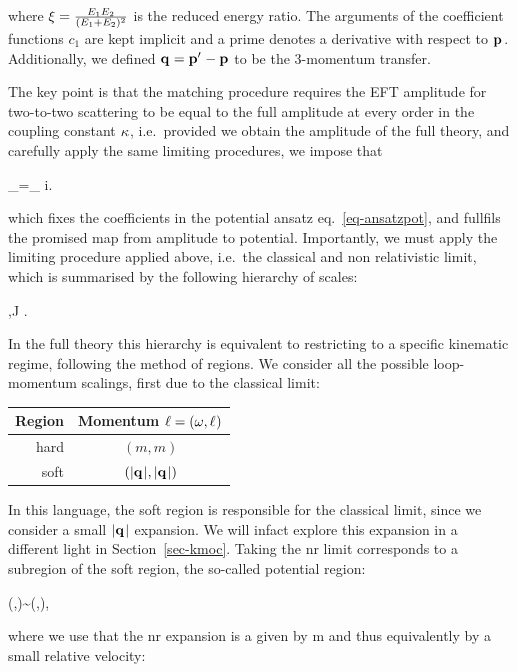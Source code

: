 \documentclass[
  11pt,
  a4paper,
  DIV=11,
  numbers=noendperiod,
  twoside]{scrreprt}
\let\[\relax \let\]\relax %
\DeclareRobustCommand{\[}{\begin{equation}}
\DeclareRobustCommand{\]}{\end{equation}}
\begin{document}
where
\(\redEratio=\frac{\energy[1]\energy[2]}{\pa{\energy[1]+\energy[2]}^2}\)
is the reduced energy ratio. The arguments of the coefficient functions
\(c_1\) are kept implicit and a prime denotes a derivative with respect
to \(\tv{\emom}\). Additionally, we defined \(\tv{q}=\tv{p'}-\tv{p}\) to
be the 3-momentum transfer.

The key point is that the matching procedure requires the EFT amplitude
for two-to-two scattering to be equal to the full amplitude at every
order in the coupling constant \(\coupling\), i.e.~provided we obtain
the amplitude of the full theory, and carefully apply the same limiting
procedures, we impose that

\[
\ampl[(i)]_=\ampl[(i)]_ \quad \forall i.
\]

which fixes the coefficients in the potential ansatz
eq.~\ref{eq-ansatzpot}, and fullfils the promised map from amplitude to
potential. Importantly, we must apply the limiting procedure applied
above, i.e.~the classical and non relativistic limit, which is
summarised by the following hierarchy of scales:

\[
\mass[1],\mass[2]\ll J  \ll {}.
\]

In the full theory this hierarchy is equivalent to restricting to a
specific kinematic regime, following the method of regions. We consider
all the possible loop-momentum scalings, first due to the classical
limit:

\begin{longtable}[]{@{}rc@{}}
\toprule()
Region & Momentum \(\ell = (\omega,\tv{\ell})\) \\
\midrule()
\endhead
hard & \((m,m)\) \\
soft & \((\abs{\tv{\tm}},\abs{\tv{\tm}})\) \\
\bottomrule()
\end{longtable}

In this language, the soft region is responsible for the classical
limit, since we consider a small \(\abs{\tv{\tm}}\) expansion. We will
infact explore this expansion in a different light in
Section~\ref{sec-kmoc}. Taking the \gls{nr} limit corresponds to a
subregion of the soft region, the so-called potential region:

\[ (\omega,\tv{\ell})\sim (\abs{\tv{\vel}}\abs{\tv{\tm}},\abs{\tv{\tm}}),\]

where we use that the \gls{nr} expansion is a given by
\[\abs{\tv{\emom}}\ll m\] and thus equivalently by a small relative velocity:
\end{document}
